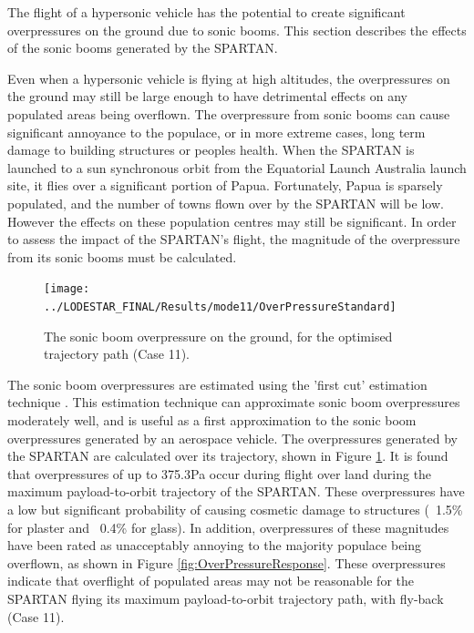 The flight of a hypersonic vehicle has the potential to create significant overpressures on the ground due to sonic booms. This section describes the effects of the sonic booms generated by the SPARTAN. 

Even when a hypersonic vehicle is flying at high altitudes, the overpressures on the ground may still be large enough to have detrimental effects on any populated areas being overflown. The overpressure from sonic booms can cause significant annoyance to the populace, or in more extreme cases, long term damage to building structures or peoples health. 
When the SPARTAN is launched to a sun synchronous orbit from the Equatorial Launch Australia launch site, it flies over a significant portion of Papua. Fortunately, Papua is sparsely populated, and the number of towns flown over by the SPARTAN will be low. However the effects on these population centres may still be significant. In order to assess the impact of the SPARTAN's flight, the magnitude of the overpressure from its sonic booms must be calculated. 
\begin{figure}[ht]
	\centering
	\texttt{[image: ../LODESTAR\_FINAL/Results/mode11/OverPressureStandard]}
	\caption{The sonic boom overpressure on the ground, for the optimised trajectory path (Case 11).}
	\label{fig:OverPressureStandard}
\end{figure}

The sonic boom overpressures are estimated using the 'first cut' estimation technique \cite{Carlson1972}. This estimation technique can approximate sonic boom overpressures moderately well, and is useful as a first approximation to the sonic boom overpressures generated by an aerospace vehicle. The overpressures generated by the SPARTAN are calculated over its trajectory, shown in Figure \ref{fig:OverPressureStandard}. It is found that overpressures of up to 375.3Pa occur during flight over land during the maximum payload-to-orbit trajectory of the SPARTAN. These overpressures have a low but significant probability of causing cosmetic damage to structures (~1.5\% for plaster and ~0.4\% for glass)\cite{Hershey1976}. In addition, overpressures of these magnitudes have been rated as unacceptably annoying to the majority populace being overflown, as shown in Figure \ref{fig:OverPressureResponse}. 
These overpressures indicate that overflight of populated areas may not be reasonable for the SPARTAN flying its maximum payload-to-orbit trajectory path, with fly-back (Case 11). 







